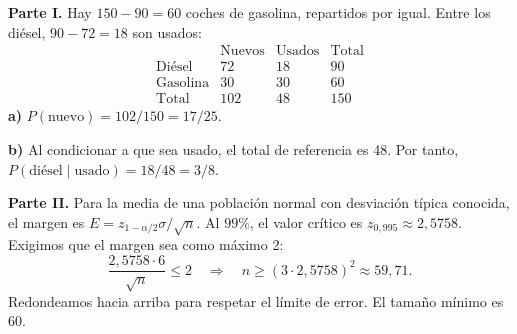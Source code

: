 \textbf{Parte I.} Hay $150-90=60$ coches de gasolina, repartidos por igual. Entre los diésel, $90-72=18$ son usados:
\[
 \begin{array}{c|rr|r}
 &\text{Nuevos}&\text{Usados}&\text{Total}\\\hline
 \text{Diésel}&72&18&90\\
 \text{Gasolina}&30&30&60\\\hline
 \text{Total}&102&48&150
 \end{array}
\]
\textbf{a)} $P(\text{nuevo})=102/150=\boxed{17/25}$.

\textbf{b)} Al condicionar a que sea usado, el total de referencia es 48. Por tanto, $P(\text{diésel}\mid\text{usado})=18/48=\boxed{3/8}$.

\textbf{Parte II.} Para la media de una población normal con desviación típica conocida, el margen es $E=z_{1-\alpha/2}\sigma/\sqrt n$. Al $99\%$, el valor crítico es $z_{0{,}995}\approx2{,}5758$. Exigimos que el margen sea como máximo 2:
\[
 \frac{2{,}5758\cdot6}{\sqrt n}\le2
 \quad\Longrightarrow\quad n\ge(3\cdot2{,}5758)^2\approx59{,}71.
\]
Redondeamos hacia arriba para respetar el límite de error. El tamaño mínimo es $\boxed{60}$.
